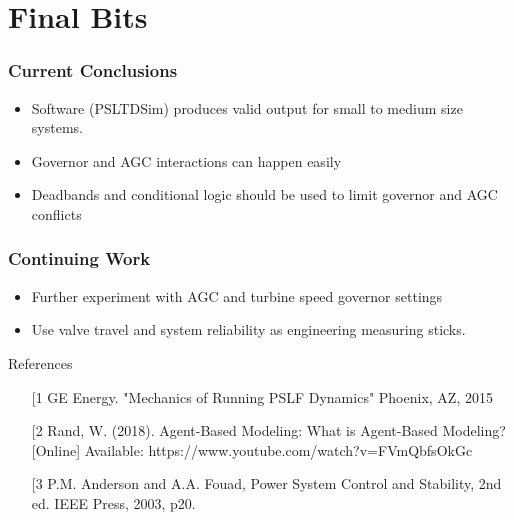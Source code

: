 \documentclass[14pt, unknownkeysallowed]{beamer}
\begin{document}
\section{Final Bits}
\begin{frame}
\frametitle{Current Conclusions}
\begin{itemize}
	\item Software (PSLTDSim) produces valid output for small to medium size systems.
	\item Governor and AGC interactions can happen easily
	\item Deadbands and conditional logic should be used to limit governor and AGC conflicts
\end{itemize}
\end{frame}
\begin{frame}
\frametitle{Continuing Work}
\begin{itemize}
\item Further experiment with AGC and turbine speed governor settings
\item Use valve travel and system reliability as engineering measuring sticks.
\end{itemize}
\end{frame}
\begin{frame}
References\vspace{1em}\\
\begin{minipage}{\textwidth}
\footnotesize
\begin{itemize}
\item[[1] GE Energy. "Mechanics of Running PSLF Dynamics" Phoenix, AZ, 2015
\item[[2] Rand, W. (2018). Agent-Based Modeling: What is Agent-Based Modeling? [Online] Available: https://www.youtube.com/watch?v=FVmQbfsOkGc
\item[[3] P.M. Anderson and A.A. Fouad, Power System Control and Stability, 2nd ed. IEEE Press, 2003, p20.
\end{itemize}
\end{minipage}
\end{frame}
\begin{frame}
\end{frame}

\begin{comment}
\frametitle{And why?}
\begin{itemize}
\item Simplification
\item Facilitate other research
\end{itemize}
\end{frame}
\begin{frame}
\frametitle{Engineering Areas of Interest}
\end{comment}
\end{document}
